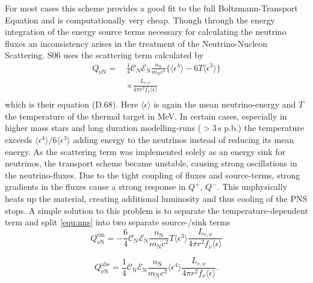 \documentclass[fleqn,usenatbib]{mnras}
\begin{document}
\begin{appendices}
 For most cases this scheme provides a good fit to the full Boltzmann-Transport Equation and is computationally very cheap. Though through the energy integration of the energy source terms necessary for calculating the neutrino fluxes an inconsistency  arises in the treatment of the Neutrino-Nucleon Scattering.
 S06 uses the scattering term calculated by \cite{Tubbs1979}
  \begin{equation}\label{equ:nns}
  \begin{aligned}
    Q_{\mathrm{\nu N}} = \, & \frac{1}{4} \mathcal{C}_N \mathcal{E}_{\mathrm{N}} \frac{n_{\mathrm{N}}}{m_{\mathrm{N}}c^2}
    \{\langle \epsilon^4 \rangle - 6 T\langle \epsilon^3 \rangle  \} \\
    & \times  \frac{L_{e,\nu}}{4\pi r^2 f_{\nu}\langle \epsilon \rangle}\\
 \end{aligned}
 \end{equation}
 which is their equation (D.68). Here $\langle \epsilon \rangle$ is again the mean neutrino-energy and $T$ the temperature of the thermal target in MeV.
 In certain cases, especially in higher mass stars and long duration modelling-runs ($ > 3 \, \text{s}$ p.b.) the temperature exceeds $\langle \epsilon^4 \rangle / 6 \langle \epsilon^3 \rangle $ adding energy to the neutrinos instead of reducing its mean energy. As the scattering term was implemented solely as an energy sink for neutrinos, the transport scheme became unstable, causing strong oscillations in the neutrino-fluxes. Due to the tight coupling of fluxes and source-terms, strong gradients in the fluxes cause a strong response in $Q^+$, $Q^-$. This unphysically heats up the material, creating additional luminosity and thus cooling of the PNS stops.
 A simple solution to this problem is to separate the temperature-dependent term and split \ref{equ:nns} into two separate source-/sink terms
   \begin{equation}\label{equ:nns1}
    Q^{\mathrm{em}}_{\nu \mathrm{N}} = - \frac{6}{4} \mathcal{C}_{\mathrm{N}} \mathcal{E}_{\mathrm{N}} \frac{n_{\mathrm{N}}}{m_{\mathrm{N}}c^2}
    T \langle \epsilon^3 \rangle \frac{L_{e,\nu}}{4\pi r^2 f_{\nu}\langle \epsilon \rangle}
 \end{equation}

 \begin{equation}\label{equ:nns2}
    Q^{\mathrm{abs}}_{\nu \mathrm{N}} = \frac{1}{4} \mathcal{C}_{\mathrm{N}} \mathcal{E}_{\mathrm{N}} \frac{n_{\mathrm{N}}}{m_{\mathrm{N}}c^2}
    \langle \epsilon^4 \rangle \frac{L_{e,\nu}}{4\pi r^2 f_{\nu}\langle \epsilon \rangle}.
 \end{equation}


\end{appendices}
\end{document}
